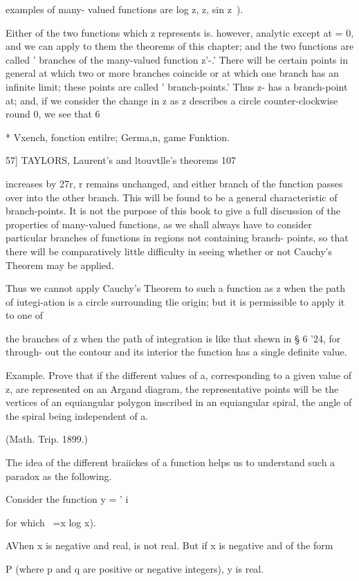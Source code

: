 {{{{examples of many- valued functions are log z, z, sin z~).

Either of the two functions which z represents is. however, analytic
except at = 0, and we can apply to them the theorems of this chapter;
and the two functions are called ' branches of the many-valued
function z'-.' There will be certain points in general at which two or
more branches coincide or at which one branch has an infinite limit;
these points are called ' branch-points.' Thus z- has a branch-point
at; and, if we consider the change in z as z describes a circle
counter-clockwise round 0, we see that 6

* Vxench, fonction entilre; Germa,n, game Funktion.

57] TAYLORS, Laurent's and ltouvtlle's theorems 107

increases by 27r, r remains unchanged, and either branch of the
function passes over into the other branch. This will be found to be a
general characteristic of branch-points. It is not the purpose of this
book to give a full discussion of the properties of many-valued
functions, as we shall always have to consider particular branches of
functions in regions not containing branch- points, so that there will
be comparatively little difficulty in seeing whether or not Cauchy's
Theorem may be applied.

Thus we cannot apply Cauchy's Theorem to such a function as z when the
path of iutegi-ation is a circle surrounding tlie origin; but it is
permissible to apply it to one of

the branches of z when the path of integration is like that shewn in §
6 '24, for through- out the contour and its interior the function has
a single definite value.

Example. Prove that if the different values of a, corresponding to a
given value of z, are represented on an Argand diagram, the
representative points will be the vertices of an equiangular polygon
inscribed in an equiangular spiral, the angle of the spiral being
independent of a.

(Math. Trip. 1899.)

The idea of the different braiickes of a function helps us to
understand such a paradox as the following.

Consider the function y = ' i

for which ~=x log x).

AVhen x is negative and real, is not real. But if x is negative and of
the form

P (where p and q are positive or negative integers), y is real.

}}}}
